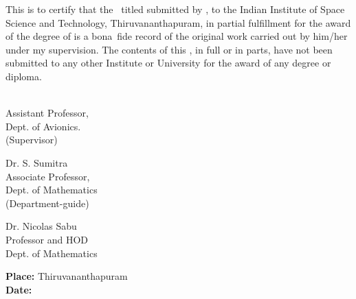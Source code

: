 This is to certify that the \Doctype\ titled \textbf{\textit{\Title}}
submitted by {\bf\Author}, to the Indian Institute of Space Science and
Technology, Thiruvananthapuram, in partial fulfillment for the award of the
degree of {\bf\Degreetext} is a bona~fide record of the original work carried
out by him/her under my supervision. The contents of this \Doctype, in full or
in parts, have not been submitted to any other Institute or University for
the award of any degree or diploma.

\vspace{35mm}
\noindent
\begin{minipage}{0.3\textwidth}
\Advisor\\
Assistant Professor,\\
Dept. of Avionics.\\
(Supervisor)
\end{minipage}
\begin{minipage}{0.3\textwidth}
	Dr. S. Sumitra\\
	Associate Professor,\\
	Dept. of Mathematics\\
	(Department-guide)
\end{minipage}
\hspace{2cm}
\begin{minipage}{0.3\textwidth}
Dr. Nicolas Sabu\\
Professor and HOD\\
Dept. of Mathematics
\end{minipage}

\vspace{30mm}
\noindent
\textbf{Place: }Thiruvananthapuram\\
\textbf{Date: \ }\Date


